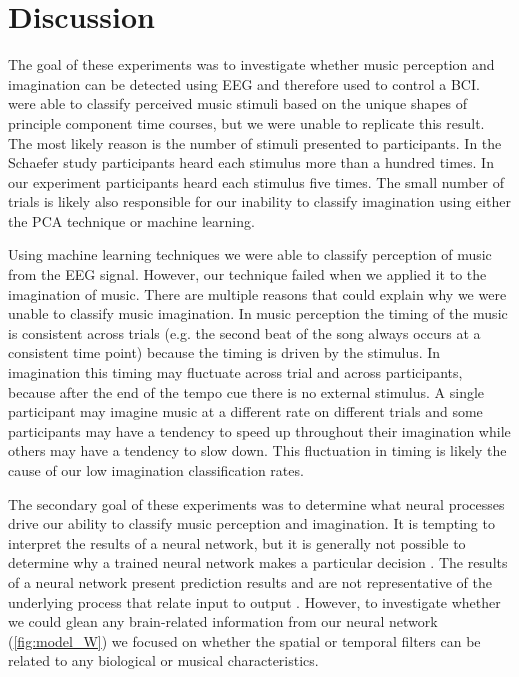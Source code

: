 \chapter*{Discussion}
The goal of these experiments was to investigate whether music perception and imagination can be detected using EEG and therefore used to control a \ac{BCI}. 
\cite{schaefer_name_2011} were able to classify perceived music stimuli based on the unique shapes of principle component time courses, but we were unable to replicate this result. 
The most likely reason is the number of stimuli presented to participants. 
In the Schaefer study participants heard each stimulus more than a hundred times. 
In our experiment participants heard each stimulus five times. 
The small number of trials is likely also responsible for our inability to classify imagination using either the PCA technique or machine learning. 

Using machine learning techniques we were able to classify perception of music from the EEG signal. 
However, our technique failed when we applied it to the imagination of music. 
There are multiple reasons that could explain why we were unable to classify music imagination.
In music perception the timing of the music is consistent across trials (e.g. the second beat of the song always occurs at a consistent time point) because the timing is driven by the stimulus. 
In imagination this timing may fluctuate across trial and across participants, because after the end of the tempo cue there is no external stimulus.
A single participant may imagine music at a different rate on different trials and some participants may have a tendency to speed up throughout their imagination while others may have a tendency to slow down. 
This fluctuation in timing is likely the cause of our low imagination classification rates. 

The secondary goal of these experiments was to determine what neural processes drive our ability to classify music perception and imagination.
It is tempting to interpret the results of a neural network, but it is generally not possible to determine why a trained neural network makes a particular decision \cite{towell_1992_interpretation}.
The results of a neural network present prediction results and are not representative of the underlying process that relate input to output \cite{intrator_2001_interpreting}.
However, to investigate whether we could glean any brain-related information from our neural network (\autoref{fig:model_W}) we focused on whether the spatial or temporal filters can be related to any biological or musical characteristics.

